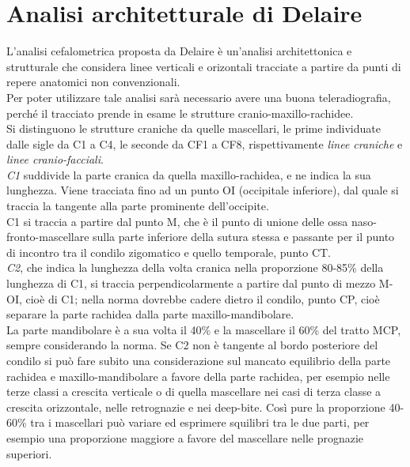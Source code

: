 \chapter{Analisi architetturale di Delaire}
L'analisi cefalometrica proposta da Delaire è un'analisi architettonica e strutturale che considera linee verticali e orizontali tracciate a partire da punti di repere anatomici non convenzionali.\\
Per poter utilizzare tale analisi sarà necessario avere una buona teleradiografia, perché il tracciato prende in esame le strutture cranio-maxillo-rachidee.\\

Si distinguono le strutture craniche da quelle mascellari, le prime individuate dalle sigle da C1 a C4, le seconde da CF1 a CF8, rispettivamente \emph{linee craniche} e \emph{linee cranio-facciali}.\\

\emph{C1} suddivide la parte cranica da quella maxillo-rachidea, e ne indica la sua lunghezza. Viene tracciata fino ad un punto OI (occipitale inferiore), dal quale si traccia la tangente alla parte prominente dell'occipite.\\
C1 si traccia a partire dal punto M, che è il punto di unione delle ossa naso-fronto-mascellare sulla parte inferiore della sutura stessa e passante per il punto di incontro tra il condilo zigomatico e quello temporale, punto CT.\\

\emph{C2}, che indica la lunghezza della volta cranica nella proporzione 80-85\% della lunghezza di C1, si traccia perpendicolarmente a partire dal punto di mezzo M-OI, cioè di C1; nella norma dovrebbe cadere dietro il condilo, punto CP, cioè separare la parte rachidea dalla parte maxillo-mandibolare.\\
La parte mandibolare è a sua volta il 40\% e la mascellare il 60\% del tratto MCP, sempre considerando la norma. Se C2 non è tangente al bordo posteriore del condilo si può fare subito una considerazione sul mancato equilibrio della parte rachidea e maxillo-mandibolare a favore della parte rachidea, per esempio nelle terze classi a crescita verticale o di quella mascellare nei casi di terza classe a crescita orizzontale, nelle retrognazie e nei deep-bite. Così pure la proporzione 40-60\% tra i mascellari può variare ed esprimere squilibri tra le due parti, per esempio una proporzione maggiore a favore del mascellare nelle prognazie superiori.\\

